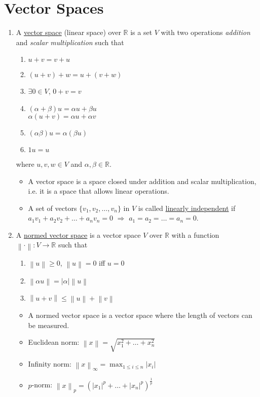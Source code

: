 \documentclass[%
 aip,
 jmp,%
 amsmath,amssymb,
 reprint,%
]{revtex4-1}
\def\R{{\mathbb R}}
\def\a{\alpha}
\def\b{\beta}
\newcommand{\norm}[1]{\left\lVert#1\right\rVert}
\newcommand{\imply}{\Rightarrow}
\newcommand{\defn}[1]{\underline{#1}}
\begin{document}
\section{Vector Spaces}
\begin{enumerate}
  \item A \defn{vector space} (linear space) over $\R$ is a set $V$
   with two operations \emph{addition} and \emph{scalar multiplication} such that
      \begin{enumerate}
        \item $u + v = v + u$
        \item $(u+v) + w = u + (v+w)$
        \item $\exists 0 \in V$, $0+v=v$
        \item $(\a + \b) u = \a  u + \b  u$ \\
              $\a  (u + v) = \a  u + \a  v $
        \item $(\a\b) u = \a (\b u)$
        \item $1 u = u$
      \end{enumerate}
      where $u,v,w \in V$ and $\a,\b \in \R$.

      \begin{itemize}
        \item {\footnotesize A vector space is a space closed under addition and
        scalar multiplication, i.e. it is a space that allows linear operations.}
        \item A set of vectors $\{v_1,v_2,\dots,v_n\}$ in $V$ is called \defn{linearly independent}
        if $a_1v_1 + a_2v_2 + \dots + a_nv_n =0$ $\imply$ $a_1=a_2=\dots=a_n=0$.

      \end{itemize}

  \item A \defn{normed vector space} is a vector space $V$ over $\R$ with a function
  $\norm{\cdot}: V \to \R$ such that
      \begin{enumerate}
        \item $\norm{u} \ge 0$, $\norm{u}=0$ iff $u=0$
        \item $\norm{\a u} = |\a| \norm{u}$
        \item $\norm{u+v} \le \norm{u} + \norm{v}$
      \end{enumerate}

      \begin{itemize}
        \item {\footnotesize A normed vector space is a vector space where the
        length of vectors can be measured. }
        \item Euclidean norm: $\norm{x} = \sqrt{x_1^2+\dots+x_n^2}$
        \item Infinity norm: $\norm{x}_{\infty} = \max_{1\le i\le n} |x_i|$
        \item $p$-norm: $\norm{x}_{p} = \left(|x_1|^p+\dots+|x_n|^p\right)^{\frac{1}{p}}$


\end{itemize}
\end{enumerate}
\end{document}
